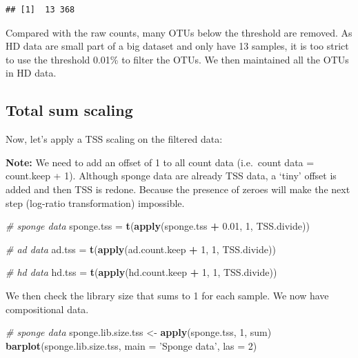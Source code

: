 \documentclass[]{book}
\newenvironment{Shaded}{\begin{snugshade}}{\end{snugshade}}
\newcommand{\KeywordTok}[1]{\textcolor[rgb]{0.13,0.29,0.53}{\textbf{#1}}}
\newcommand{\DataTypeTok}[1]{\textcolor[rgb]{0.13,0.29,0.53}{#1}}
\newcommand{\DecValTok}[1]{\textcolor[rgb]{0.00,0.00,0.81}{#1}}
\newcommand{\FloatTok}[1]{\textcolor[rgb]{0.00,0.00,0.81}{#1}}
\newcommand{\StringTok}[1]{\textcolor[rgb]{0.31,0.60,0.02}{#1}}
\newcommand{\CommentTok}[1]{\textcolor[rgb]{0.56,0.35,0.01}{\textit{#1}}}
\newcommand{\OperatorTok}[1]{\textcolor[rgb]{0.81,0.36,0.00}{\textbf{#1}}}
\newcommand{\NormalTok}[1]{#1}
\begin{document}
\begin{verbatim}
## [1]  13 368
\end{verbatim}

Compared with the raw counts, many OTUs below the threshold are removed.
As HD data are small part of a big dataset and only have 13 samples, it
is too strict to use the threshold 0.01\% to filter the OTUs. We then
maintained all the OTUs in HD data.

\subsection{Total sum scaling}\label{total-sum-scaling}

Now, let's apply a TSS scaling on the filtered data:

\textbf{Note:} We need to add an offset of 1 to all count data
(i.e.~count data = count.keep + 1). Although sponge data are already TSS
data, a `tiny' offset is added and then TSS is redone. Because the
presence of zeroes will make the next step (log-ratio transformation)
impossible.

\begin{Shaded}
\begin{Highlighting}[]
\CommentTok{# sponge data}
\NormalTok{sponge.tss =}\StringTok{ }\KeywordTok{t}\NormalTok{(}\KeywordTok{apply}\NormalTok{(sponge.tss }\OperatorTok{+}\StringTok{ }\FloatTok{0.01}\NormalTok{, }\DecValTok{1}\NormalTok{, TSS.divide))}

\CommentTok{# ad data}
\NormalTok{ad.tss =}\StringTok{ }\KeywordTok{t}\NormalTok{(}\KeywordTok{apply}\NormalTok{(ad.count.keep }\OperatorTok{+}\StringTok{ }\DecValTok{1}\NormalTok{, }\DecValTok{1}\NormalTok{, TSS.divide))}

\CommentTok{# hd data}
\NormalTok{hd.tss =}\StringTok{ }\KeywordTok{t}\NormalTok{(}\KeywordTok{apply}\NormalTok{(hd.count.keep }\OperatorTok{+}\StringTok{ }\DecValTok{1}\NormalTok{, }\DecValTok{1}\NormalTok{, TSS.divide))}
\end{Highlighting}
\end{Shaded}

We then check the library size that sums to 1 for each sample. We now
have compositional data.

\begin{Shaded}
\begin{Highlighting}[]
\CommentTok{# sponge data}
\NormalTok{sponge.lib.size.tss <-}\StringTok{ }\KeywordTok{apply}\NormalTok{(sponge.tss, }\DecValTok{1}\NormalTok{, sum)}
\KeywordTok{barplot}\NormalTok{(sponge.lib.size.tss, }\DataTypeTok{main =}  \StringTok{'Sponge data'}\NormalTok{, }\DataTypeTok{las =} \DecValTok{2}\NormalTok{)}
\end{Highlighting}
\end{Shaded}
\end{document}
